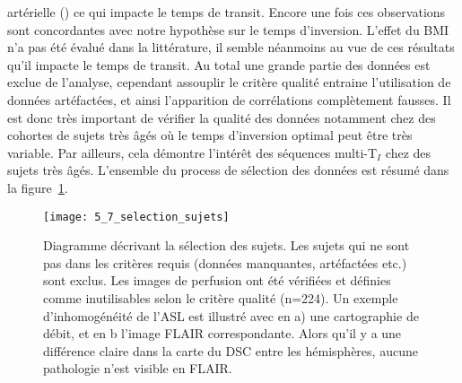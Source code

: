 artérielle (\cite{Rubin2012}) ce qui impacte le temps de transit. Encore une fois ces observations sont concordantes
avec notre hypothèse sur le temps d’inversion. L’effet du BMI n’a pas été évalué dans la littérature, il
semble néanmoins au vue de ces résultats qu’il impacte le temps de transit. Au total une grande partie
des données est exclue de l’analyse, cependant assouplir le critère qualité entraine l’utilisation de
données artéfactées, et ainsi l’apparition de corrélations complètement fausses. Il est donc très
important de vérifier la qualité des données notamment chez des cohortes de sujets très âgés où le
temps d’inversion optimal peut être très variable. Par ailleurs, cela démontre l’intérêt des séquences
multi-T$_I$ chez des sujets très âgés. L'ensemble du process de sélection des données est résumé dans la figure~\ref{fig:5_7_selection_sujets}.\\
\begin{figure}[!t]
\centering
\texttt{[image: 5\_7\_selection\_sujets]}
\caption{Diagramme décrivant la sélection des sujets. Les sujets qui ne sont pas dans les critères requis (données
manquantes, artéfactées etc.) sont exclus. Les images de perfusion ont été vérifiées et définies comme inutilisables selon le
critère qualité (n=224). Un exemple d’inhomogénéité de l’ASL est illustré avec en a) une cartographie de débit, et en b
l’image FLAIR correspondante. Alors qu’il y a une différence claire dans la carte du DSC entre les hémisphères, aucune
pathologie n’est visible en FLAIR.}
\label{fig:5_7_selection_sujets}	
\end{figure}
